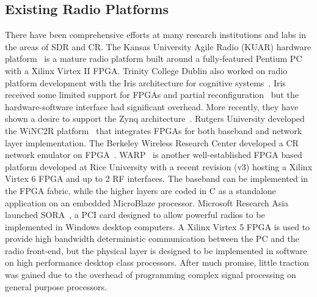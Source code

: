 \subsection{Existing Radio Platforms}
There have been comprehensive efforts at many research institutions and labs in the areas of SDR and CR.
The Kansas University Agile Radio (KUAR) hardware platform~\cite{Minden2007} is a mature radio platform built around a fully-featured Pentium PC with a Xilinx Virtex II FPGA.
Trinity College Dublin also worked on radio platform development with the Iris architecture for cognitive systems~\cite{Sutton2006}. Iris~\cite{Sutton2010} received some limited support for FPGAs and partial reconfiguration~\cite{fahmy2009,lotze2009} but the hardware-software interface had significant overhead. More recently, they have shown a desire to support the Zynq architecture~\cite{Belt2013}.
Rutgers University developed the WiNC2R platform~\cite{Miljanic2007} that integrates FPGAs for both baseband and network layer implementation.
The Berkeley Wireless Research Center developed a CR network emulator on FPGA~\cite{So2008}.
WARP~\cite{amiri2007} is another well-established FPGA based platform developed at Rice University with a recent revision (v3) hosting a Xilinx Virtex 6 FPGA and up to 2 RF interfaces. The baseband can be implemented in the FPGA fabric, while the higher layers are coded in C as a standalone application on an embedded MicroBlaze processor.
Microsoft Research Asia launched SORA~\cite{tan2011sora}, a PCI card designed to allow powerful radios to be implemented in Windows desktop computers.
A Xilinx Virtex 5 FPGA is used to provide high bandwidth deterministic communication between the PC and the radio front-end, but the physical layer is designed to be implemented in software on high performance desktop class processors.
After much promise, little traction was gained due to the overhead of programming complex signal processing on general purpose processors.

